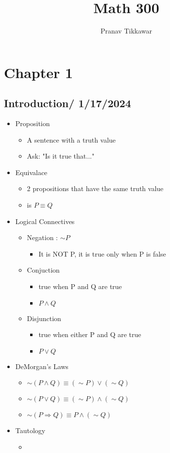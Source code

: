 \documentclass{article}
\author{Pranav Tikkawar}
\title{Math 300}
\begin{document}
\maketitle

\section{Chapter 1}
\subsection{Introduction/ 1/17/2024}

\begin{itemize}
    \item Proposition 
    \begin{itemize}
        \item A sentence with a truth value
        \item Ask: "Is it true that..."
    \end{itemize}
    \item Equivalace
    \begin{itemize}
        \item 2 propositions that have the same truth value
        \item is $P \equiv Q$
    \end{itemize}
    \item Logical Connectives
    \begin{itemize}
        \item Negation : $\sim P$ 
        \begin{itemize}
            \item It is NOT P, it is true only when P is false
        \end{itemize}
        \item Conjuction
        \begin{itemize}
            \item true when P and Q are true
            \item $P \wedge Q$
        \end{itemize}
        \item Disjunction
        \begin{itemize}
            \item true when either P and Q are true
            \item $P \vee Q$
        \end{itemize}
    \end{itemize}
    \item DeMorgan's Laws
    \begin{itemize}
        \item $\sim (P \land Q) \equiv (\sim P) \lor (\sim Q) $
        \item $\sim (P \lor Q) \equiv (\sim P) \land (\sim Q) $
        \item $\sim (P \Rightarrow Q) \equiv P \land (\sim Q)$
    \end{itemize}
    \item Tautology
    \begin{itemize}
        \item 
    \end{itemize}
\end{itemize}
\end{document}
